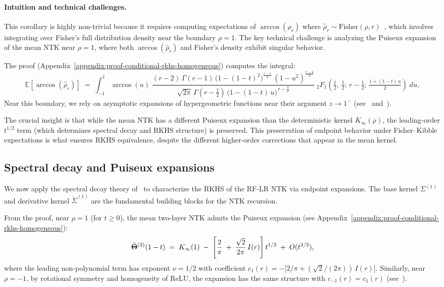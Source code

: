 \paragraph{Intuition and technical challenges.}
This corollary is highly non-trivial because it requires computing expectations of \( \arccos(\hat{\rho}_r) \) where \( \hat{\rho}_r \sim \text{Fisher}(\rho,r) \)~\cite{fisher1915probable,hotelling1953new}, which involves integrating over Fisher's full distribution density near the boundary \( \rho = 1 \). The key technical challenge is analyzing the Puiseux expansion of the mean NTK near \( \rho = 1 \), where both \( \arccos(\hat{\rho}_r) \) and Fisher's density exhibit singular behavior.

The proof (Appendix~\ref{appendix:proof-conditional-rkhs-homogeneous}) computes the integral:
\[
\mathbb{E}[\arccos(\hat{\rho}_r)] \;=\; \int_{-1}^{1} \arccos(u)\;
\frac{(r-2)\,\Gamma(r-1)\,\big(1-(1-t)^2\big)^{\frac{r-1}{2}}\,(1-u^2)^{\frac{r-4}{2}}}{\sqrt{2\pi}\,\Gamma\!\left(r-\tfrac{1}{2}\right)\,\big(1-(1-t)\,u\big)^{\,r-\frac{3}{2}}}\;
{}_2F_1\!\left(\tfrac{1}{2},\,\tfrac{1}{2};\, r-\tfrac{1}{2};\, \tfrac{1+(1-t)\,u}{2}\right)\; du,
\]
Near this boundary, we rely on asymptotic expansions of hypergeometric functions near their argument \( z \to 1^- \) (see~\cite{nist_dlmf} and~\cite{abramowitz1964handbook}).

The crucial insight is that while the mean NTK has a different Puiseux expansion than the deterministic kernel \( K_{\infty}(\rho) \), the leading-order \( t^{1/2} \) term (which determines spectral decay and RKHS structure) is preserved. This preservation of endpoint behavior under Fisher–Kibble expectations is what ensures RKHS equivalence, despite the different higher-order corrections that appear in the mean kernel.


\vspace{0.5em}
\subsection{Spectral decay and Puiseux expansions}\label{subsec:spectral-decay-puiseux}
We now apply the spectral decay theory of~\cite{bietti2021deepequalsshallowrelu} to characterize the RKHS of the RF-LR NTK via endpoint expansions. The base kernel \( \Sigma^{(1)} \) and derivative kernel \( \dot{\Sigma}^{(1)} \) are the fundamental building blocks for the NTK recursion.

From the proof, near \( \rho = 1 \) (for \( t \ge 0 \)), the mean two-layer NTK admits the Puiseux expansion (see Appendix~\ref{appendix:proof-conditional-rkhs-homogeneous}):
\[
\tilde{\boldsymbol{\Theta}}^{(2)}(1-t)
\;=\;
K_\infty(1)
\;-\;
\Bigg[\frac{2}{\pi} \;+\; \frac{\sqrt{2}}{2\pi}\,I(r)\Bigg]\,t^{1/2}
\;+\; O(t^{3/2}),
\]
where the leading non-polynomial term has exponent \( \nu = 1/2 \) with coefficient \( c_1(r) = -\big[2/\pi + (\sqrt{2}/(2\pi))\,I(r)\big] \). Similarly, near \( \rho = -1 \), by rotational symmetry and homogeneity of ReLU, the expansion has the same structure with \( c_{-1}(r) = c_1(r) \) (see~\cite{bietti2021deepequalsshallowrelu}).


